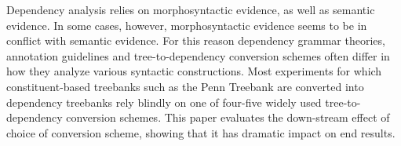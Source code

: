 Dependency analysis relies on morphosyntactic evidence, as well as semantic evidence. In some cases, however, morphosyntactic evidence seems to be in
 conflict with semantic evidence. For this reason dependency grammar theories,
 annotation guidelines and tree-to-dependency conversion schemes often differ in
 how they analyze various syntactic constructions. Most experiments for which
 constituent-based treebanks such as the Penn Treebank are converted into
 dependency treebanks rely blindly on one of four-five widely used
 tree-to-dependency conversion schemes. This paper evaluates the down-stream
 effect of choice of conversion scheme, showing that it has dramatic impact on
 end results.


